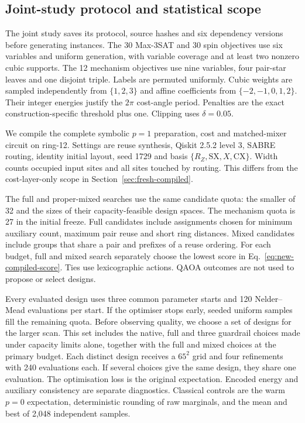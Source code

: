 \documentclass[a4paper,onecolumn,11pt,unpublished]{quantumarticle}
\theoremstyle{remark}
\begin{document}
\subsection{Joint-study protocol and statistical scope}\label{sec:v3-methods}
The joint study saves its protocol, source hashes and six dependency versions
before generating instances. The 30 Max-3SAT and 30 spin objectives use six
variables and uniform generation, with variable coverage and at least two
nonzero cubic supports. The 12 mechanism objectives use nine variables,
four pair-star leaves and one disjoint triple. Labels are permuted uniformly.
Cubic weights are sampled independently from $\{1,2,3\}$ and affine
coefficients from $\{-2,-1,0,1,2\}$. Their integer energies justify the
$2\pi$ cost-angle period. Penalties are the exact construction-specific
threshold plus one. Clipping uses $\delta=0.05$.

We compile the complete symbolic $p=1$ preparation, cost and matched-mixer
circuit on ring-12. Settings are reuse synthesis, Qiskit 2.5.2 level 3,
SABRE routing, identity initial layout, seed 1729 and basis
$\{R_Z,\mathrm{SX},X,\mathrm{CX}\}$. Width counts occupied input sites
and all sites touched by routing. This differs from the cost-layer-only
scope in Section~\ref{sec:fresh-compiled}.

The full and proper-mixed searches use the same candidate quota: the smaller
of 32 and the sizes of their capacity-feasible design spaces. The mechanism
quota is 27 in the initial freeze. Full candidates include assignments chosen
for minimum auxiliary count, maximum pair reuse and short ring distances.
Mixed candidates include groups that share a pair and prefixes of a reuse
ordering. For each budget, full and mixed search separately choose the
lowest score in Eq.~\eqref{eq:new-compiled-score}. Ties use lexicographic
actions. QAOA outcomes are not used to propose or select designs.

Every evaluated design uses three common parameter starts and 120
Nelder--Mead evaluations per start. If the optimiser stops early, seeded
uniform samples fill the remaining quota. Before observing quality, we
choose a set of designs for the larger scan. This set includes the native,
full and three guardrail choices made under capacity limits alone, together
with the full and mixed choices at the primary budget. Each distinct design
receives a $65^2$ grid and four refinements with 240 evaluations each.
If several choices give the same design, they share one evaluation.
The optimisation loss is the original expectation. Encoded energy and
auxiliary consistency are separate diagnostics. Classical controls are the
warm $p=0$ expectation, deterministic rounding of raw marginals, and the mean
and best of 2,048 independent samples.
\end{document}
